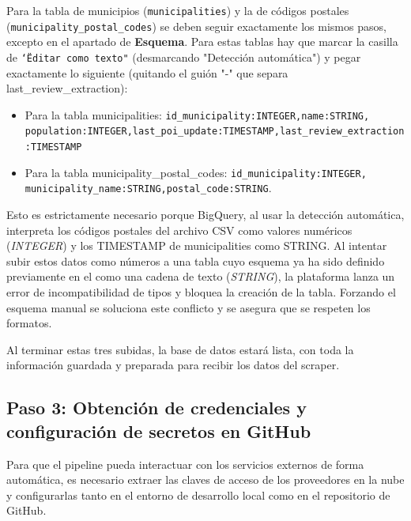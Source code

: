 Para la tabla de municipios (\texttt{municipalities}) y la de códigos postales (\texttt{municipality\_postal\_codes}) se deben seguir exactamente los mismos pasos, excepto en el apartado de \textbf{Esquema}. Para estas tablas hay que marcar la casilla de \texttt{\char`\"Editar como texto"} (desmarcando "Detección automática") y pegar exactamente lo siguiente (quitando el guión "-" que separa last\_review\_extraction): 
\begin{itemize}
    \item Para la tabla municipalities: \texttt{id\_municipality:INTEGER,name:STRING, population:INTEGER,last\_poi\_update:TIMESTAMP,last\_review\_\-extraction:TIMESTAMP}
    \item Para la tabla municipality\_postal\_codes: \texttt{id\_municipality:INTEGER, municipality\_name:STRING,postal\_code:STRING}.
\end{itemize}
Esto es estrictamente necesario porque BigQuery, al usar la detección automática, interpreta los códigos postales del archivo CSV como valores numéricos (\textit{INTEGER}) y los TIMESTAMP de municipalities como STRING. Al intentar subir estos datos como números a una tabla cuyo esquema ya ha sido definido previamente en el  como una cadena de texto (\textit{STRING}), la plataforma lanza un error de incompatibilidad de tipos y bloquea la creación de la tabla. Forzando el esquema manual se soluciona este conflicto y se asegura que se respeten los formatos.

Al terminar estas tres subidas, la base de datos estará lista, con toda la información guardada y preparada para recibir los datos del scraper.


\subsection{Paso 3: Obtención de credenciales y configuración de secretos en GitHub}
Para que el pipeline pueda interactuar con los servicios externos de forma automática, es necesario extraer las claves de acceso de los proveedores en la nube y configurarlas tanto en el entorno de desarrollo local como en el repositorio de GitHub.

